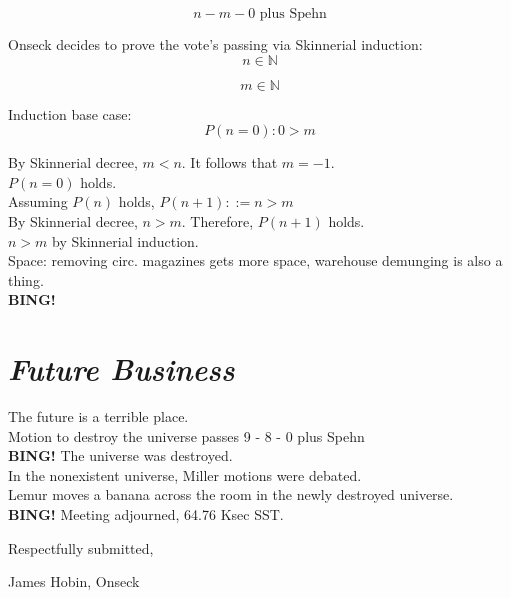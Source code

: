\documentclass[10pt]{article}
\newcommand{\bing}{{\bf BING!} }
\newcommand{\goto}[1]{\bing \vskip 12pt \section*{{\em{#1}}}}
\newcommand{\onseck}{James Hobin, Onseck}
\begin{document}
\begin{displaymath}n - m - 0 \textrm{ plus Spehn\xspace }\end{displaymath}

Onseck decides to prove the vote's passing via Skinnerial induction: \\

\begin{displaymath}n \in \mathbb{N}\end{displaymath}


\begin{displaymath}m \in \mathbb{N}\end{displaymath}

Induction base case: \\

\begin{displaymath}P(n=0): 0 > m\end{displaymath}

By Skinnerial decree, $m < n$. It follows that $m = -1$. \\
$P(n=0)$ holds. \\
Assuming $P(n)$ holds, $P(n+1) ::= n > m$ \\
By Skinnerial decree, $n > m$. Therefore, $P(n+1)$ holds. \\
$n > m$ by Skinnerial induction. \\
Space: removing circ. magazines gets more space, warehouse demunging is also a thing. \\

\goto{Future Business}
The future is a terrible place. \\
Motion to destroy the universe passes 9 - 8 - 0 plus Spehn \\
\bing
The universe was destroyed. \\
In the nonexistent universe, Miller motions were debated. \\
Lemur moves a banana across the room in the newly destroyed universe. \\

\bing
\noindent
Meeting adjourned, 64.76 Ksec SST.

\vspace{18pt}

\centerline{Respectfully submitted,}
\centerline{\onseck}
\end{document}

